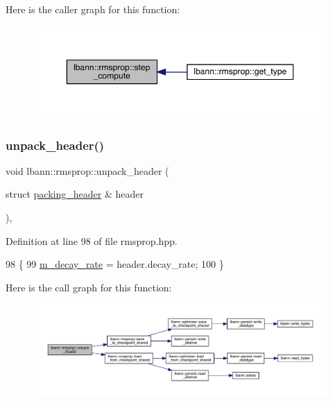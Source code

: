 Here is the caller graph for this function\+:\nopagebreak
\begin{figure}[H]
\begin{center}
\leavevmode
\includegraphics[width=350pt]{classlbann_1_1rmsprop_a600e4b332299a6aaa36d0b7ff458e3f3_icgraph}
\end{center}
\end{figure}
\mbox{\label{classlbann_1_1rmsprop_a1af03b4c5e744abae04ccec3e19a0cc6}} 
\subsubsection{\texorpdfstring{unpack\+\_\+header()}{unpack\_header()}}
{\footnotesize\ttfamily void lbann\+::rmsprop\+::unpack\+\_\+header (\begin{DoxyParamCaption}\item[{struct \hyperlink{structlbann_1_1rmsprop_1_1packing__header}{packing\+\_\+header} \&}]{header }\end{DoxyParamCaption})\hspace{0.3cm}{\ttfamily [inline]}, {\ttfamily [private]}}



Definition at line 98 of file rmsprop.\+hpp.


\begin{DoxyCode}
98                                                    \{
99     \hyperlink{classlbann_1_1rmsprop_a9cd712c44e7c4995120e2933b0387d71}{m\_decay\_rate} = header.decay\_rate;
100   \}
\end{DoxyCode}
Here is the call graph for this function\+:\nopagebreak
\begin{figure}[H]
\begin{center}
\leavevmode
\includegraphics[width=350pt]{classlbann_1_1rmsprop_a1af03b4c5e744abae04ccec3e19a0cc6_cgraph}
\end{center}
\end{figure}
\mbox{\label{classlbann_1_1rmsprop_a9b969263276b4d1aed93c3c82abf832d}} 
